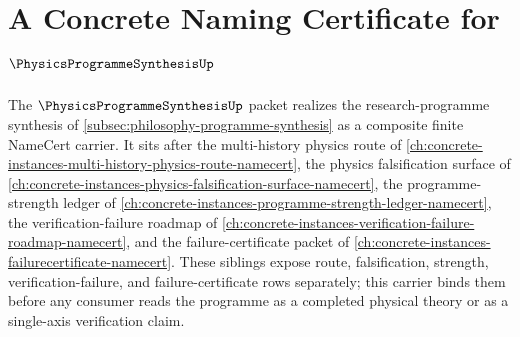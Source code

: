 \chapter{A Concrete Naming Certificate for $\PhysicsProgrammeSynthesisUp$}
\label{ch:concrete-instances-physicsprogrammesynthesis-namecert}

The $\PhysicsProgrammeSynthesisUp$ packet realizes the research-programme synthesis of \autoref{subsec:philosophy-programme-synthesis} as a composite finite NameCert carrier. It sits after the multi-history physics route of \autoref{ch:concrete-instances-multi-history-physics-route-namecert}, the physics falsification surface of \autoref{ch:concrete-instances-physics-falsification-surface-namecert}, the programme-strength ledger of \autoref{ch:concrete-instances-programme-strength-ledger-namecert}, the verification-failure roadmap of \autoref{ch:concrete-instances-verification-failure-roadmap-namecert}, and the failure-certificate packet of \autoref{ch:concrete-instances-failurecertificate-namecert}. These siblings expose route, falsification, strength, verification-failure, and failure-certificate rows separately; this carrier binds them before any consumer reads the programme as a completed physical theory or as a single-axis verification claim.

